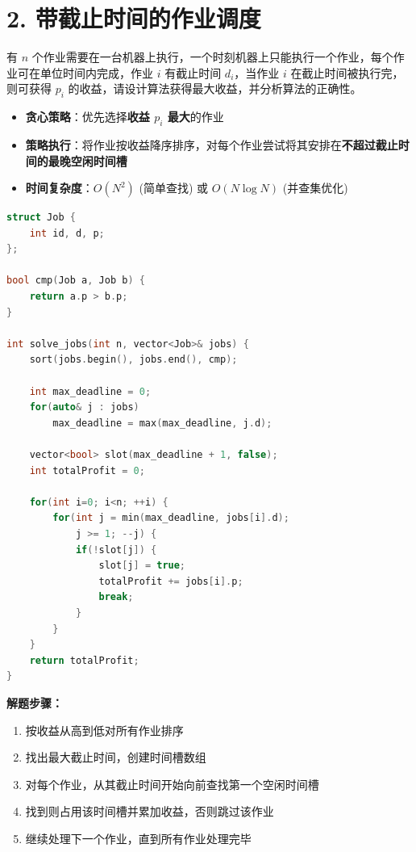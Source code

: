 \section*{2. 带截止时间的作业调度}

有 $n$ 个作业需要在一台机器上执行，一个时刻机器上只能执行一个作业，每个作业可在单位时间内完成，作业 $i$ 有截止时间 $d_i$，当作业 $i$ 在截止时间被执行完，则可获得 $p_i$ 的收益，请设计算法获得最大收益，并分析算法的正确性。

\begin{itemize}
    \item \textbf{贪心策略}：优先选择\textbf{收益 $p_i$ 最大}的作业
    \item \textbf{策略执行}：将作业按收益降序排序，对每个作业尝试将其安排在\textbf{不超过截止时间的最晚空闲时间槽}
    \item \textbf{时间复杂度}：$O(N^2)$ (简单查找) 或 $O(N \log N)$ (并查集优化)
\end{itemize}

\begin{lstlisting}[language=C++, style=cppstyle]
struct Job {
    int id, d, p;
};

bool cmp(Job a, Job b) {
    return a.p > b.p;
}

int solve_jobs(int n, vector<Job>& jobs) {
    sort(jobs.begin(), jobs.end(), cmp);

    int max_deadline = 0;
    for(auto& j : jobs)
        max_deadline = max(max_deadline, j.d);

    vector<bool> slot(max_deadline + 1, false);
    int totalProfit = 0;

    for(int i=0; i<n; ++i) {
        for(int j = min(max_deadline, jobs[i].d);
            j >= 1; --j) {
            if(!slot[j]) {
                slot[j] = true;
                totalProfit += jobs[i].p;
                break;
            }
        }
    }
    return totalProfit;
}
\end{lstlisting}

\textbf{解题步骤：}
\begin{enumerate}
    \item 按收益从高到低对所有作业排序
    \item 找出最大截止时间，创建时间槽数组
    \item 对每个作业，从其截止时间开始向前查找第一个空闲时间槽
    \item 找到则占用该时间槽并累加收益，否则跳过该作业
    \item 继续处理下一个作业，直到所有作业处理完毕
\end{enumerate}
